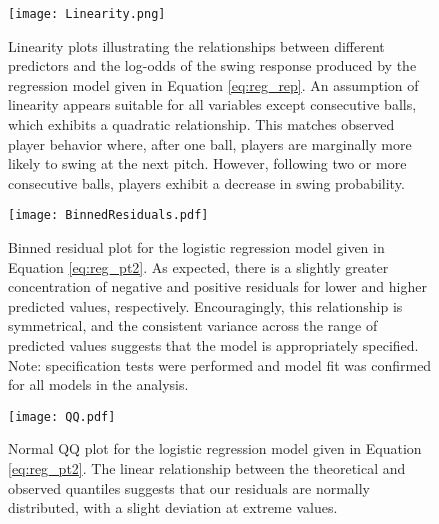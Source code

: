 \documentclass[12pt]{article}
\numberwithin{equation}{section}
\begin{document}
\begin{figure}[H]
    \centering
    \texttt{[image: Linearity.png]}
    \captionsetup{font=small, width=0.9\linewidth}
    \caption{Linearity plots illustrating the relationships between different predictors and the log-odds of the swing response produced by the regression model given in Equation \ref{eq:reg_rep}. An assumption of linearity appears suitable for all variables except consecutive balls, which exhibits a quadratic relationship. This matches observed player behavior where, after one ball, players are marginally more likely to swing at the next pitch. However, following two or more consecutive balls, players exhibit a decrease in swing probability.}
    \label{fig:LinearityTestLog}
\end{figure}

\begin{figure}[H]
    \centering
    \texttt{[image: BinnedResiduals.pdf]}
    \captionsetup{font=small, width=0.9\linewidth}
    \caption{Binned residual plot for the logistic regression model given in Equation \ref{eq:reg_pt2}. As expected, there is a slightly greater concentration of negative and positive residuals for lower and higher predicted values, respectively. Encouragingly, this relationship is symmetrical, and the consistent variance across the range of predicted values suggests that the model is appropriately specified. Note: specification tests were performed and model fit was confirmed for all models in the analysis.}
    \label{fig:ResidualsBinned}
\end{figure}

\begin{figure}[H]
    \centering
    \texttt{[image: QQ.pdf]}
    \captionsetup{font=small, width=0.9\linewidth}
    \caption{Normal QQ plot for the logistic regression model given in Equation \ref{eq:reg_pt2}. The linear relationship between the theoretical and observed quantiles suggests that our residuals are normally distributed, with a slight deviation at extreme values.}
    \label{fig:QQ}
\end{figure}

\clearpage


\printbibliography
\nocite{*}

\end{document}
